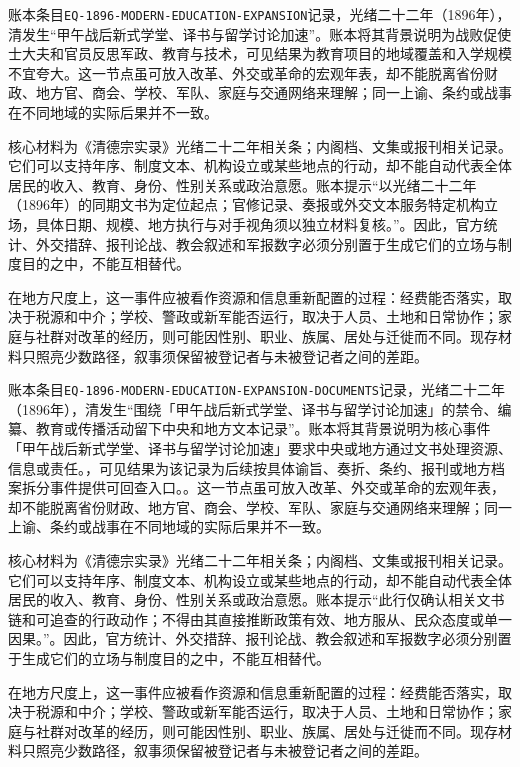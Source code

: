 账本条目\texttt{EQ-1896-MODERN-EDUCATION-EXPANSION}记录，光绪二十二年（1896年），清发生“甲午战后新式学堂、译书与留学讨论加速”。账本将其背景说明为战败促使士大夫和官员反思军政、教育与技术，可见结果为教育项目的地域覆盖和入学规模不宜夸大。这一节点虽可放入改革、外交或革命的宏观年表，却不能脱离省份财政、地方官、商会、学校、军队、家庭与交通网络来理解；同一上谕、条约或战事在不同地域的实际后果并不一致。

核心材料为《清德宗实录》光绪二十二年相关条；内阁档、文集或报刊相关记录。它们可以支持年序、制度文本、机构设立或某些地点的行动，却不能自动代表全体居民的收入、教育、身份、性别关系或政治意愿。账本提示“以光绪二十二年（1896年）的同期文书为定位起点；官修记录、奏报或外交文本服务特定机构立场，具体日期、规模、地方执行与对手视角须以独立材料复核。”。因此，官方统计、外交措辞、报刊论战、教会叙述和军报数字必须分别置于生成它们的立场与制度目的之中，不能互相替代。

在地方尺度上，这一事件应被看作资源和信息重新配置的过程：经费能否落实，取决于税源和中介；学校、警政或新军能否运行，取决于人员、土地和日常协作；家庭与社群对改革的经历，则可能因性别、职业、族属、居处与迁徙而不同。现存材料只照亮少数路径，叙事须保留被登记者与未被登记者之间的差距。

账本条目\texttt{EQ-1896-MODERN-EDUCATION-EXPANSION-DOCUMENTS}记录，光绪二十二年（1896年），清发生“围绕「甲午战后新式学堂、译书与留学讨论加速」的禁令、编纂、教育或传播活动留下中央和地方文本记录”。账本将其背景说明为核心事件「甲午战后新式学堂、译书与留学讨论加速」要求中央或地方通过文书处理资源、信息或责任。，可见结果为该记录为后续按具体谕旨、奏折、条约、报刊或地方档案拆分事件提供可回查入口。。这一节点虽可放入改革、外交或革命的宏观年表，却不能脱离省份财政、地方官、商会、学校、军队、家庭与交通网络来理解；同一上谕、条约或战事在不同地域的实际后果并不一致。

核心材料为《清德宗实录》光绪二十二年相关条；内阁档、文集或报刊相关记录。它们可以支持年序、制度文本、机构设立或某些地点的行动，却不能自动代表全体居民的收入、教育、身份、性别关系或政治意愿。账本提示“此行仅确认相关文书链和可追查的行政动作；不得由其直接推断政策有效、地方服从、民众态度或单一因果。”。因此，官方统计、外交措辞、报刊论战、教会叙述和军报数字必须分别置于生成它们的立场与制度目的之中，不能互相替代。

在地方尺度上，这一事件应被看作资源和信息重新配置的过程：经费能否落实，取决于税源和中介；学校、警政或新军能否运行，取决于人员、土地和日常协作；家庭与社群对改革的经历，则可能因性别、职业、族属、居处与迁徙而不同。现存材料只照亮少数路径，叙事须保留被登记者与未被登记者之间的差距。

